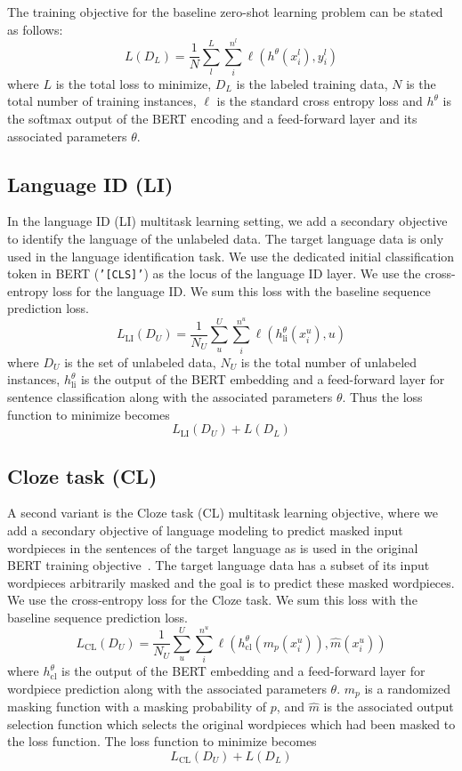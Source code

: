 \documentclass[letterpaper]{article} \usepackage{aaai20}  \usepackage{times}  \usepackage{helvet} \usepackage{courier}  \usepackage[hyphens]{url}  \usepackage{graphicx} \urlstyle{rm} \def\UrlFont{\rm}  \usepackage{graphicx}  \frenchspacing  \setlength{\pdfpagewidth}{8.5in}  \setlength{\pdfpageheight}{11in}  \usepackage{amsmath}
\begin{document}
The training objective for the baseline zero-shot learning problem can be stated as follows:
\[
L(D_L) = \frac{1}{N} \sum_l^L \sum_i^{n^l} \ell(h^{\theta}(x_i^l), y_i^l)
\]
\noindent where $L$ is the total loss to minimize, $D_L$ is the labeled training data, $N$ is the total number of training instances, $\ell$ is the standard cross entropy loss and $h^{\theta}$ is the softmax output of the BERT encoding and a feed-forward layer and its associated parameters $\theta$.








\subsection{Language ID (LI)}

In the language ID (LI) multitask learning setting,
we add a secondary objective to identify the language of the unlabeled data. The
target language data is only used in the language identification
task. 
We use the dedicated initial classification token in BERT
(\texttt{'[CLS]'}) as the locus of the language ID layer. We use the
cross-entropy loss for the language ID. We sum this loss with the
baseline sequence prediction loss.
\[
L_{\mbox{LI}}(D_U) = \frac{1}{N_U} \sum_u^U \sum_i^{n^u} \ell(h_{\mbox{li}}^{\theta}(x_i^u), u)
\]
where $D_U$ is the set of unlabeled data, $N_U$ is the total number of unlabeled instances, $h_{\mbox{li}}^{\theta}$ is the output of the BERT embedding and a feed-forward layer for sentence classification along with the associated parameters $\theta$. Thus the loss function to minimize becomes
\[
L_{\mbox{LI}}(D_U) + L(D_L)
\]

\subsection{Cloze task (CL)}

A second variant is the Cloze task (CL) multitask learning objective, where
we add a secondary objective of language modeling to predict masked input wordpieces in the sentences of the target language as is used in the original BERT training objective~\cite{BERT18}.
The target language data has a subset of its input
wordpieces arbitrarily masked and the goal is to predict these masked wordpieces. We use the cross-entropy loss for the Cloze task. We sum this
loss with the baseline sequence prediction loss.
\[
L_{\mbox{CL}}(D_U) = \frac{1}{N_U} \sum_u^U \sum_i^{n^u} \ell(h_{\mbox{cl}}^{\theta}(m_p(x_i^u)), \hat{m}(x_i^u))
\]
where $h_{\mbox{cl}}^{\theta}$ is the output of the BERT embedding and a feed-forward layer for wordpiece prediction along with the associated parameters $\theta$. $m_p$ is a randomized masking function with a masking probability of $p$, and $\hat{m}$ is the associated output selection function which selects the original wordpieces which had been masked to the loss function. The loss function to minimize becomes
\[
L_{\mbox{CL}}(D_U) + L(D_L)
\]
\end{document}
